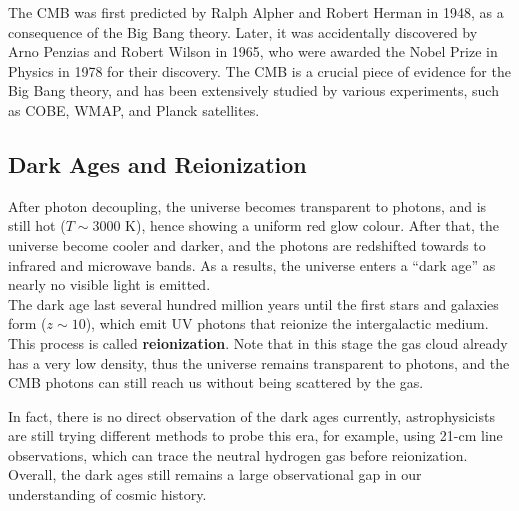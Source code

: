 \bigskip \noindent
\begin{extra}
    The CMB was first predicted by Ralph Alpher and Robert Herman in 1948, as a consequence of the Big Bang theory. Later, it was accidentally discovered by Arno Penzias and Robert Wilson in 1965, who were awarded the Nobel Prize in Physics in 1978 for their discovery. The CMB is a crucial piece of evidence for the Big Bang theory, and has been extensively studied by various experiments, such as COBE, WMAP, and Planck satellites.
\end{extra}

\clearpage
\subsection{Dark Ages and Reionization}
\begin{intuition}
    After photon decoupling, the universe becomes transparent to photons, and is still hot ($T\sim 3000$ K), hence showing a uniform red glow colour. After that, the universe become cooler and darker, and the photons are redshifted towards to infrared and microwave bands. As a results, the universe enters a ``dark age'' as nearly no visible light is emitted. \\

    The dark age last several hundred million years until the first stars and galaxies form ($z \sim 10$), which emit UV photons that reionize the intergalactic medium. This process is called \textbf{reionization}. Note that in this stage the gas cloud already has a very low density, thus the universe remains transparent to photons, and the CMB photons can still reach us without being scattered by the gas. \\
\end{intuition}

\bigskip \noindent
\begin{remark}
    In fact, there is no direct observation of the dark ages currently, astrophysicists are still trying different methods to probe this era, for example, using 21-cm line observations, which can trace the neutral hydrogen gas before reionization. Overall, the dark ages still remains a large observational gap in our understanding of cosmic history.
\end{remark}


\bigskip \noindent \bigskip \noindent \bigskip \noindent
